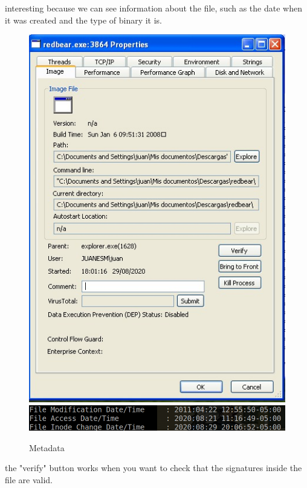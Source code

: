 \documentclass[10pt,a4paper]{article} %
\begin{document}
            interesting because we can see information about the file, such as
            the date when it was created and the type of binary it is.
            \\
            \begin{figure}[h!]
                \centering
                \includegraphics[width=0.4\linewidth]{fig10.jpeg} \\
                \includegraphics[width=0.4\linewidth]{meta.png}
                \caption{Metadata}
                \label{10}
            \end{figure}
            the "verify" button works when you want to check that the
            signatures inside the file are valid.
\end{document}
